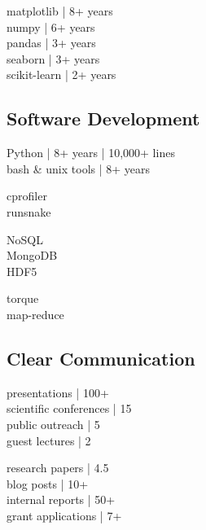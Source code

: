 \documentclass[]{winter-resume-openfont}
\begin{document}
\begin{minipage}[t]{0.29\textwidth}
\textbullet{} matplotlib | 8+ years \\ 
\textbullet{} numpy | 6+ years \\ 
\textbullet{} pandas | 3+ years \\ 
\textbullet{} seaborn | 3+ years \\
\textbullet{} scikit-learn | 2+ years \\
\sectionsep
\sectionsep

\subsection{Software Development}
\sectionsep

\textbullet{} Python | 8+ years | 10,000+ lines\\
\textbullet{}  bash \& unix tools | 8+ years \\
 \sectionsep

\textbullet{} cprofiler \\ 
\textbullet{} runsnake \\ 
\sectionsep

\textbullet{} NoSQL \\  
\textbullet{} MongoDB \\
\textbullet{} HDF5 \\ 
\sectionsep

\textbullet{} torque \\
\textbullet{} map-reduce \\
\sectionsep

\sectionsep

\subsection{Clear Communication}
\sectionsep

\textbullet{} presentations | 100+  \\
\textbullet{} scientific conferences | 15 \\
\textbullet{} public outreach | 5 \\
\textbullet{} guest lectures | 2\\
\sectionsep

\textbullet{} research papers | 4.5\\
\textbullet{} blog posts | 10+\\ 
\textbullet{} internal reports | 50+\\
\textbullet{} grant applications | 7+ \\


\end{minipage}
\end{document}

